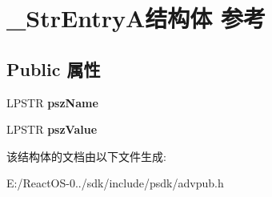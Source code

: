 \hypertarget{struct___str_entry_a}{}\section{\+\_\+\+Str\+Entry\+A结构体 参考}
\label{struct___str_entry_a}
\subsection*{Public 属性}
\begin{DoxyCompactItemize}
\item 
\mbox{\label{struct___str_entry_a_a436b4ea7d25e1dfbf499e3f0e1f95fce}} 
L\+P\+S\+TR {\bfseries psz\+Name}
\item 
\mbox{\label{struct___str_entry_a_a6ba89cd0c0b6f6cb7c2abb7d36c5a62b}} 
L\+P\+S\+TR {\bfseries psz\+Value}
\end{DoxyCompactItemize}


该结构体的文档由以下文件生成\+:\begin{DoxyCompactItemize}
\item 
E\+:/\+React\+O\+S-\/0../sdk/include/psdk/advpub.\+h\end{DoxyCompactItemize}
